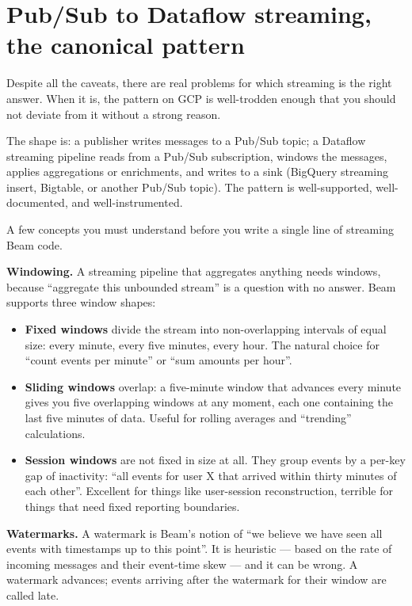\documentclass[
  11pt,
  british,
  oneside]{book}
\providecommand{\tightlist}{%
  \setlength{\itemsep}{0pt}\setlength{\parskip}{0pt}}
\begin{document}
\hypertarget{pubsub-to-dataflow-streaming-the-canonical-pattern}{%
\section{Pub/Sub to Dataflow streaming, the canonical
pattern}\label{pubsub-to-dataflow-streaming-the-canonical-pattern}}

Despite all the caveats, there are real problems for which streaming is
the right answer. When it is, the pattern on GCP is well-trodden enough
that you should not deviate from it without a strong reason.

The shape is: a publisher writes messages to a Pub/Sub topic; a Dataflow
streaming pipeline reads from a Pub/Sub subscription, windows the
messages, applies aggregations or enrichments, and writes to a sink
(BigQuery streaming insert, Bigtable, or another Pub/Sub topic). The
pattern is well-supported, well-documented, and well-instrumented.

A few concepts you must understand before you write a single line of
streaming Beam code.

\textbf{Windowing.} A streaming pipeline that
aggregates anything needs windows, because ``aggregate this unbounded
stream'' is a question with no answer. Beam supports three window
shapes:

\begin{itemize}
\tightlist
\item
  \textbf{Fixed windows} divide the stream into non-overlapping
  intervals of equal size: every minute, every five minutes, every hour.
  The natural choice for ``count events per minute'' or ``sum amounts
  per hour''.
\item
  \textbf{Sliding windows} overlap: a five-minute window that advances
  every minute gives you five overlapping windows at any moment, each
  one containing the last five minutes of data. Useful for rolling
  averages and ``trending'' calculations.
\item
  \textbf{Session windows} are not fixed in size at all. They group
  events by a per-key gap of inactivity: ``all events for user X that
  arrived within thirty minutes of each other''. Excellent for things
  like user-session reconstruction, terrible for things that need fixed
  reporting boundaries.
\end{itemize}

\textbf{Watermarks.} A watermark is Beam's notion of
``we believe we have seen all events with timestamps up to this point''.
It is heuristic --- based on the rate of incoming messages and their
event-time skew --- and it can be wrong. A watermark advances; events
arriving after the watermark for their window are called late.
\end{document}

